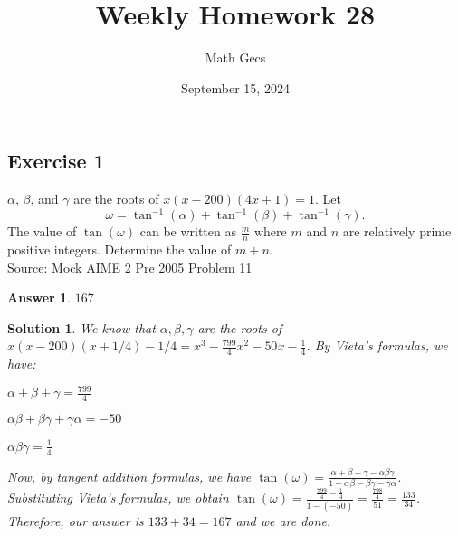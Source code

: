 \documentclass[12pt]{article}
\title{Weekly Homework 28}
\author{Math Gecs}
\date{September 15, 2024}
\newtheorem*{answer*}{Answer}
\newtheorem*{solution*}{Solution}
\begin{document}
\maketitle

\subsection*{Exercise 1}
$\alpha$, $\beta$, and $\gamma$ are the roots of $x(x-200)(4x+1) = 1$. Let\[\omega = \tan^{-1}(\alpha) + \tan^{-1}(\beta) + \tan^{-1} (\gamma).\]The value of $\tan(\omega)$ can be written as $\tfrac{m}{n}$ where $m$ and $n$ are relatively prime positive integers. Determine the value of $m+n$.\\

Source: Mock AIME 2 Pre 2005 Problem 11\\

\begin{answer*}
$\boxed{167}$
\end{answer*}

\begin{solution*}
We know that $\alpha, \beta, \gamma$ are the roots of $x(x-200)(x+1/4)-1/4 = x^3 - \frac{799}{4}x^2 - 50x - \frac{1}{4}$. By Vieta's formulas, we have:

$\alpha + \beta + \gamma = \frac{799}{4}$

$\alpha\beta + \beta\gamma + \gamma\alpha = -50$

$\alpha\beta\gamma = \frac{1}{4}$

Now, by tangent addition formulas, we have $\tan(\omega) = \frac{\alpha + \beta + \gamma - \alpha\beta\gamma}{1 - \alpha\beta - \beta\gamma - \gamma\alpha}$. Substituting Vieta's formulas, we obtain $\tan(\omega) = \frac{\frac{799}{4} - \frac{1}{4}}{1 - (-50)} = \frac{\frac{798}{4}}{51} = \frac{133}{34}$. Therefore, our answer is $133 + 34 = \boxed{167}$ and we are done.
\end{solution*}
\end{document}
